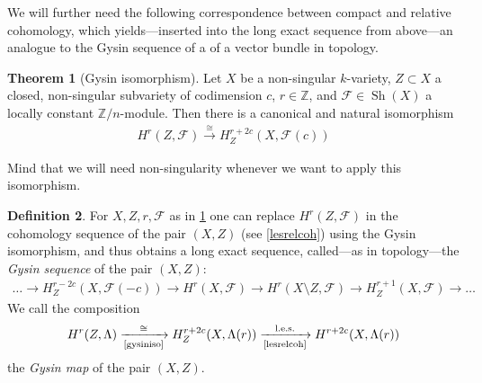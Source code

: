 \documentclass[english,headsepline=0.25pt]{scrartcl}
\theoremstyle{definition}
\newtheorem{Def}{Definition}[section]
\newtheorem{Thm}[Def]{Theorem}
\theoremstyle{remark}
\newcommand*{\Z}{\mathds{Z}}
\newcommand*{\Zmod}[1]{\Z/#1} %
\newcommand*{\F}{\mathcal{F}} %
\DeclareMathOperator{\Sh}{Sh} %
\begin{document}
We will further need the following correspondence between compact and
relative cohomology, which yields---inserted into the long exact
sequence from above---an analogue to the Gysin sequence of a of a
vector bundle in topology.
\begin{Thm}[Gysin isomorphism]\label{gysiniso}
  Let $X$ be a non-singular $k$-variety,
  $Z\subset X$ a closed, non-singular subvariety of codimension $c$,
  $r\in\Z$,
  and $\F\in\Sh(X)$ a locally constant $\Zmod{n}$-module.
  Then there is a canonical and natural isomorphism
  \begin{gather*}
    H^{r}\left(Z,\F\right)
    \xrightarrow{\cong}
    H_Z^{r+2c}\left(X,\F(c)\right)
  \end{gather*}    
\end{Thm}
Mind that we will need non-singularity whenever we want to apply
this isomorphism.
\begin{Def}
  For $X,Z,r,\F$ as in \ref{gysiniso} one can replace
  $H^{r}(Z,\F)$ in the cohomology sequence of the pair
  $(X,Z)$ (see \ref{lesrelcoh}) using the Gysin isomorphism, and thus
  obtains a long exact sequence, called---as in topology---the
  \emph{Gysin sequence} of the pair $(X,Z)$:
  \begin{gather*}
    \dotsc
    \to H_Z^{r-2c}\left(X,\F(-c)\right)
    \to H^r(X,\F)
    \to H^r(X\setminus Z,\F)
    \to H_Z^{r+1}(X,\F)
    \to \dotsc    
  \end{gather*}
  We call the composition
  \begin{gather*}
    H^r(Z,\Lambda)
    \xrightarrow[\text{\ref{gysiniso}}]{\cong}
    H_Z^{r+2c}(X,\Lambda(r))
    \xrightarrow[\text{\ref{lesrelcoh}}]{\text{l.e.s.}}
    H^{r+2c}(X,\Lambda(r))
  \end{gather*}
  the \emph{Gysin map} of the pair $(X,Z)$.
\end{Def}
\end{document}
